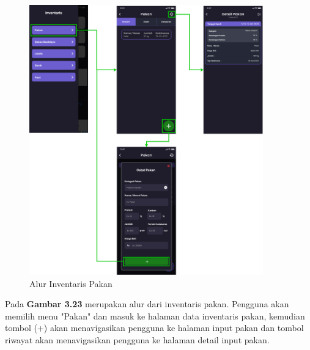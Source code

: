 \begin{enumerate}
\begin{enumerate}
		\begin{figure}[H]
			\centering
			\includegraphics[width=0.9\textwidth]{gambar/sprint2/flow_feed.png}
			\caption{Alur Inventaris Pakan}
		\end{figure}

		Pada \textbf{Gambar 3.23} merupakan alur dari inventaris pakan. Pengguna akan memilih menu "Pakan" dan masuk ke halaman data inventaris pakan, kemudian tombol (+) akan menavigasikan pengguna ke halaman input pakan dan tombol riwayat akan menavigasikan pengguna ke halaman detail input pakan.


\end{enumerate}
\end{enumerate}

